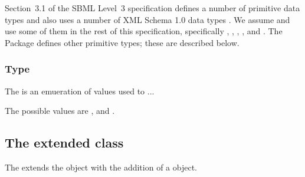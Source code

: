 Section~3.1 of the SBML Level~3 specification defines a number of
primitive data types and also uses a number of XML Schema 1.0 data types
\citep{biron:2000}. We assume and use some of them in the rest of this
specification, specifically , ,
, , and . The \Groups
Package defines other primitive types; these are described below.


\subsubsection{Type \fixttspace{}}



The  is an emueration of values used to ...

The possible values are ,  and
.

\subsection{The extended  class}
\label{model-class}




The \GroupsPackage extends the  object with the addition of
a \ListOfGroups object.

